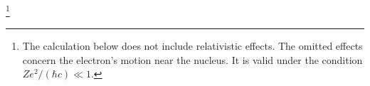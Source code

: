 \footnote{The calculation below does not include relativistic effects. The omitted effects concern the electron's motion near the nucleus. It is valid under the condition $Ze^2/(\hbar c)\ll1$.}
